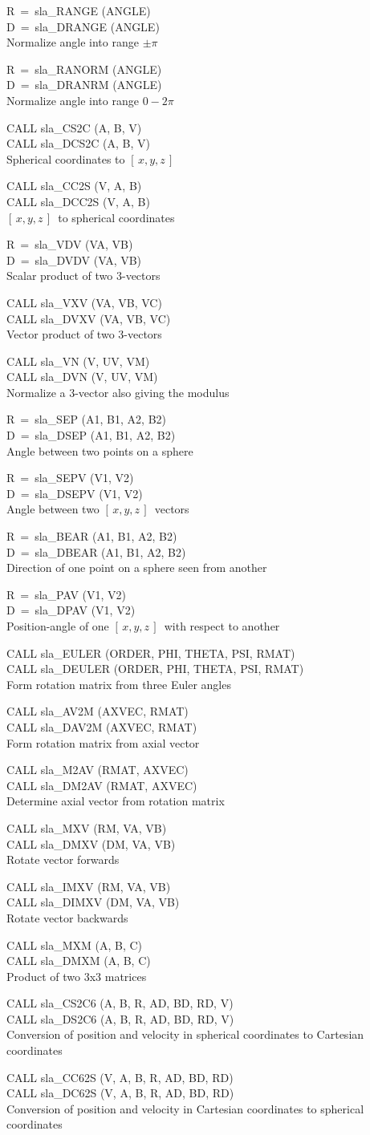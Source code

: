\documentclass[11pt,twoside,nolof]{starlink}
\providecommand{\xyz}       {$[\,x,y,z\,]$}
\providecommand{\callhead}[1]{\goodbreak\vspace{\bigskipamount}{\large\bf{#1}}}
\newenvironment{callset}{\begin{list}{}{\setlength{\leftmargin}{2cm}
                             \setlength{\parsep}{\smallskipamount}}}{\end{list}}
\providecommand{\subq}[2]{\item\hspace{-1cm}#1\\\hspace*{-1cm}#2\\}
\begin{document}
\callhead{Angles, Vectors and Rotation Matrices}
\begin{callset}
\subq{R~=~sla\_RANGE (ANGLE)}
     {D~=~sla\_DRANGE (ANGLE)}
   Normalize angle into range $\pm\pi$
\subq{R~=~sla\_RANORM (ANGLE)}
     {D~=~sla\_DRANRM (ANGLE)}
   Normalize angle into range $0\!-\!2\pi$
\subq{CALL sla\_CS2C (A, B, V)}
     {CALL sla\_DCS2C (A, B, V)}
   Spherical coordinates to \xyz
\subq{CALL sla\_CC2S (V, A, B)}
     {CALL sla\_DCC2S (V, A, B)}
   \xyz\ to spherical coordinates
\subq{R~=~sla\_VDV (VA, VB)}
     {D~=~sla\_DVDV (VA, VB)}
   Scalar product of two 3-vectors
\subq{CALL sla\_VXV (VA, VB, VC)}
     {CALL sla\_DVXV (VA, VB, VC)}
   Vector product of two 3-vectors
\subq{CALL sla\_VN (V, UV, VM)}
     {CALL sla\_DVN (V, UV, VM)}
   Normalize a 3-vector also giving the modulus
\subq{R~=~sla\_SEP (A1, B1, A2, B2)}
     {D~=~sla\_DSEP (A1, B1, A2, B2)}
   Angle between two points on a sphere
\subq{R~=~sla\_SEPV (V1, V2)}
     {D~=~sla\_DSEPV (V1, V2)}
   Angle between two \xyz\ vectors
\subq{R~=~sla\_BEAR (A1, B1, A2, B2)}
     {D~=~sla\_DBEAR (A1, B1, A2, B2)}
   Direction of one point on a sphere seen from another
\subq{R~=~sla\_PAV (V1, V2)}
     {D~=~sla\_DPAV (V1, V2)}
   Position-angle of one \xyz\ with respect to another
\subq{CALL sla\_EULER (ORDER, PHI, THETA, PSI, RMAT)}
     {CALL sla\_DEULER (ORDER, PHI, THETA, PSI, RMAT)}
   Form rotation matrix from three Euler angles
\subq{CALL sla\_AV2M (AXVEC, RMAT)}
     {CALL sla\_DAV2M (AXVEC, RMAT)}
   Form rotation matrix from axial vector
\subq{CALL sla\_M2AV (RMAT, AXVEC)}
     {CALL sla\_DM2AV (RMAT, AXVEC)}
   Determine axial vector from rotation matrix
\subq{CALL sla\_MXV (RM, VA, VB)}
     {CALL sla\_DMXV (DM, VA, VB)}
   Rotate vector forwards
\subq{CALL sla\_IMXV (RM, VA, VB)}
     {CALL sla\_DIMXV (DM, VA, VB)}
   Rotate vector backwards
\subq{CALL sla\_MXM (A, B, C)}
     {CALL sla\_DMXM (A, B, C)}
   Product of two 3x3 matrices
\subq{CALL sla\_CS2C6 (A, B, R, AD, BD, RD, V)}
     {CALL sla\_DS2C6 (A, B, R, AD, BD, RD, V)}
   Conversion of position and velocity in spherical
     coordinates to Cartesian coordinates
\subq{CALL sla\_CC62S (V, A, B, R, AD, BD, RD)}
     {CALL sla\_DC62S (V, A, B, R, AD, BD, RD)}
   Conversion of position and velocity in Cartesian
     coordinates to spherical coordinates
\end{callset}
\end{document}
